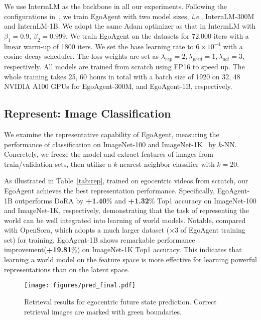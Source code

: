 We use IntermLM as the backbone in all our experiments. Following the configurations in~\cite{guo2024data}, we train EgoAgent with two model sizes, \emph{i.e.}, InternLM-300M and InternLM-1B. We adopt the same Adam optimizer as that in IntermLM with $\beta_{1}=0.9$, $\beta_{2}=0.999$. We train EgoAgent on the datasets for 72,000 iters with a linear warm-up of 1800 iters. We set the base learning rate to $6\times 10^{-4}$ with a cosine decay scheduler. The loss weights are set as $\lambda_{rep}=2, \lambda_{pred}=1,  \lambda_{act}=3$, respectively. All models are trained from scratch using FP16 to speed up. The whole training takes 25, 60 hours in total with a batch size of 1920 on 32, 48 NVIDIA A100 GPUs for EgoAgent-300M, and EgoAgent-1B, respectively.



\subsection{Represent: Image Classification}
We examine the representative capability of EgoAgent, measuring the performance of classification on ImageNet-100 and ImageNet-1K~\cite{deng2009imagenet} by $k$-NN. Concretely, we freeze the model and extract features of images from train/validation sets, then utilize a $k$-nearest neighbor classifier with $k=20$. 


\vspace{1.5mm}
 As illustrated in Table~\ref{tab:rep}, trained on egocentric videos from scratch, our EgoAgent achieves the best representation performance. Specifically, EgoAgent-1B outperforms DoRA by \textbf{+1.40}\% and \textbf{+1.32}\% Top1 accuracy on ImageNet-100 and ImageNet-1K, respectively, demonstrating that the task of representing the world can be well integrated into learning of world models. Notable, compared with OpenSora, which adopts a much larger dataset ($\times$3 of EgoAgent training set) for training, EgoAgent-1B shows remarkable performance improvement(\textbf{+19.81}\%) on ImageNet-1K Top1 accuracy. This indicates that learning a world model on the feature space is more effective for learning powerful representations than on the latent space.
\begin{figure*}
    \centering
    \texttt{[image: figures/pred\_final.pdf]}
        \vspace{-0.5em}
    \caption{Retrieval results for egocentric future state prediction. Correct retrieval images are marked with green boundaries.}
    \label{fig:pred}
\end{figure*}

